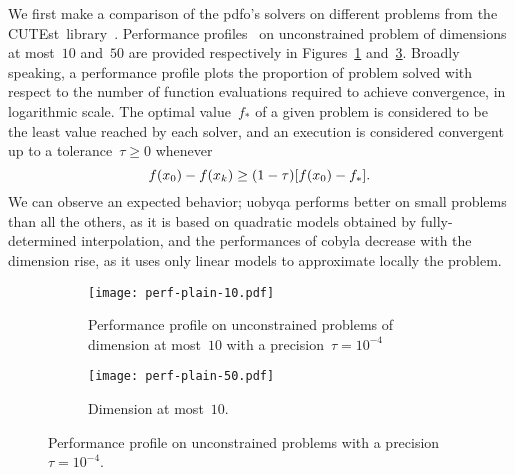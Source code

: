 \documentclass[11pt,draft]{article}
\numberwithin{equation}{section}
\newcommand{\iter}[1][k]{x\ifthenelse{\equal{#1}{}}{}{_{#1}}}
\newcommand{\obj}{f}
\def\cutest{\mbox{CUTEst}}
\begin{document}
We first make a comparison of the \gls{pdfo}'s solvers on different problems from the \cutest\ library~\cite{Gould_Orban_Toint_2015}.
Performance profiles~\cite{Dolan_More_2002, More_Wild_2009} on unconstrained problem of dimensions at most~$10$ and~$50$ are provided respectively in Figures~\ref{fig:ppu-10} and~\ref{fig:ppu-50}.
Broadly speaking, a performance profile plots the proportion of problem solved with respect to the number of function evaluations required to achieve convergence, in logarithmic scale.
The optimal value~$\obj_{\ast}$ of a given problem is considered to be the least value reached by each solver, and an execution is considered convergent up to a tolerance~$\tau \ge 0$ whenever
\begin{equation}
    \label{eq:cvt}
    \obj(\iter[0]) - \obj(\iter) \ge (1 - \tau) [\obj(\iter[0]) - \obj_{\ast}].
\end{equation}
We can observe an expected behavior; \gls{uobyqa} performs better on small problems than all the others, as it is based on quadratic models obtained by fully-determined interpolation, and the performances of \gls{cobyla} decrease with the dimension rise, as it uses only linear models to approximate locally the problem.

\begin{figure}[ht]
    \begin{subfigure}{.48\textwidth}
        \centering
        \texttt{[image: perf-plain-10.pdf]}
    \caption{Performance profile on unconstrained problems of dimension at most~$10$ with a precision~$\tau = 10^{-4}$}
        \label{fig:ppu-10}
    \end{subfigure}
    \hfill
    \begin{subfigure}{.48\textwidth}
        \centering
        \texttt{[image: perf-plain-50.pdf]}
        \caption{Dimension at most~$10$.}
        \label{fig:ppu-50}
    \end{subfigure}
    \caption{Performance profile on unconstrained problems with a precision~$\tau = 10^{-4}$.}
\end{figure}
\end{document}
